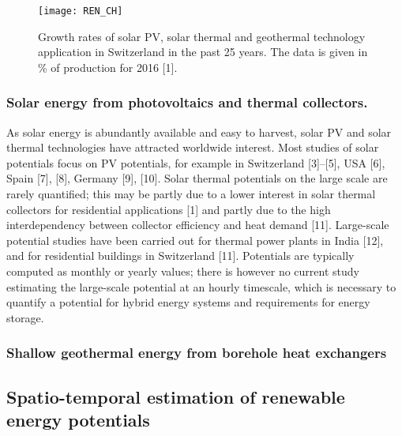 \begin{figure}[tb] 
\centering 
\texttt{[image: REN\_CH]} 
\caption[Growth rates of solar PV, solar thermal and geothermal technology application in Switzerland in the past 25 years.]{Growth rates of solar PV, solar thermal and geothermal technology application in Switzerland in the past 25 years. The data is given in \% of production for 2016 [1].}
\label{fig:ren_ch} 
\end{figure}

\subsubsection{Solar energy from photovoltaics and thermal collectors.}
As solar energy is abundantly available and easy to harvest, solar PV and solar thermal technologies have attracted worldwide interest. Most studies of solar potentials focus on PV potentials, for example in Switzerland [3]–[5], USA [6], Spain [7], [8], Germany [9], [10]. Solar thermal potentials on the large scale are rarely quantified; this may be partly due to a lower interest in solar thermal collectors for residential applications [1] and partly due to the high interdependency between collector efficiency and heat demand [11]. Large-scale potential studies have been carried out for thermal power plants in India [12], and for residential buildings in Switzerland [11]. Potentials are typically computed as monthly or yearly values; there is however no current study estimating the large-scale potential at an hourly timescale, which is necessary to quantify a potential for hybrid energy systems and requirements for energy storage. 

\subsubsection{Shallow geothermal energy from borehole heat exchangers}


\subsection{Spatio-temporal estimation of renewable energy potentials}

